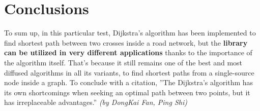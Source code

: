 \documentclass{article}                                                                                                     %
\begin{document}
\section{Conclusions}                                                                                                       %
\label{sec:conclusions}                                                                                                     %
  To sum up, in this particular test, Dijkstra’s algorithm has been implemented to find shortest path between two crosses   %
  inside a road network, but the \textbf{library can be utilized in very different applications} thanks to the importance
  of the algorithm itself. That's because it still remains one of the best and most diffused algorithms in all its
  variants, to find shortest paths from a single-source node inside a graph. To conclude with a citation, ”The Dijkstra’s
  algorithm has its own shortcomings when seeking an optimal path between two points, but it has irreplaceable
  advantages.” \textit{(by DongKai Fan, Ping Shi)}
  \cite{5569452}                                                                                                            %
\end{document}
